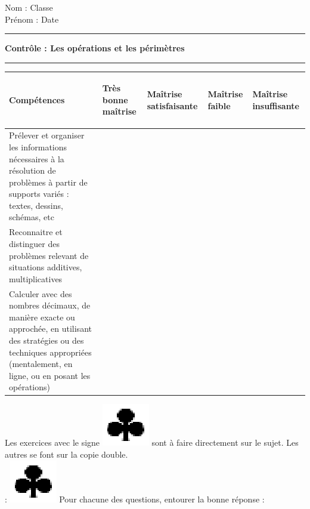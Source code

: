 \documentclass[a4paper,11pt]{article}
\newcounter{numexo}
\newcommand{\exo}[1]{\stepcounter{numexo}\noindent{\bf Exercice~\thenumexo} : \marginpar{\hfill /#1}}
\newcommand{\titre}[5] 
{
\noindent #2 \hfill #4 \\
#3 \hfill #5

\vspace{-1.6cm}

\begin{center}\rule{6cm}{0.5mm}\end{center}
\vspace{0.2cm}
\begin{center}{\large{\textbf{#1}}}\end{center}
\begin{center}\rule{6cm}{0.5mm}\end{center}
}
\begin{document}
\pagestyle{empty}
\titre{Contrôle : Les opérations et les périmètres }{Nom :}{Prénom :}{Classe}{Date}

\vspace*{0.15cm}

\begin{flushleft}
\begin{tabular}{|m{6.5cm}|m{2.5cm}|m{2.5cm}|m{2.5cm}|m{2.5cm}|}
\hline 
\textbf{Compétences} & \begin{center}
\textbf{Très bonne maîtrise}
\end{center} & \begin{center}
\textbf{Maîtrise satisfaisante}
\end{center}  & \begin{center}
\textbf{Maîtrise faible}
\end{center} & \begin{center}
\textbf{Maîtrise insuffisante}
\end{center} \\ 
\hline 
 Prélever et organiser les informations nécessaires à la résolution de problèmes à partir de supports variés : textes, dessins, schémas, etc &  &  & &\\
\hline
Reconnaitre et distinguer des problèmes relevant de situations additives, multiplicatives &  &  & & \\ 
\hline
 Calculer avec des nombres décimaux, de manière exacte ou approchée, en utilisant des stratégies ou des techniques appropriées (mentalement, en ligne, ou en posant les opérations) &  &  &  &\\ 
\hline 



\end{tabular} 
\end{flushleft}

\vspace*{0.5cm}

Les exercices avec le signe \includegraphics[scale=0.3]{trefle.eps} sont à faire directement sur le sujet. Les autres se font sur la copie double.\\

\exo{4.5} \includegraphics[scale=0.3]{trefle.eps} Pour chacune des questions, entourer la bonne réponse :
\end{document}
